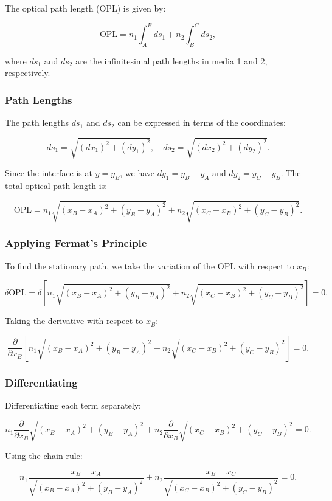 \documentclass[
  a4paper,
]{book}
\begin{document}
\begin{tcolorbox}
The optical path length (OPL) is given by:

\[
\text{OPL} = n_1 \int_{A}^{B} ds_1 + n_2 \int_{B}^{C} ds_2,
\]

where \(ds_1\) and \(ds_2\) are the infinitesimal path lengths in media
1 and 2, respectively.

\subsubsection{Path Lengths}\label{path-lengths}

The path lengths \(ds_1\) and \(ds_2\) can be expressed in terms of the
coordinates:

\[
ds_1 = \sqrt{(dx_1)^2 + (dy_1)^2}, \quad ds_2 = \sqrt{(dx_2)^2 + (dy_2)^2}.
\]

Since the interface is at \(y = y_B\), we have \(dy_1 = y_B - y_A\) and
\(dy_2 = y_C - y_B\). The total optical path length is:

\[
\text{OPL} = n_1 \sqrt{(x_B - x_A)^2 + (y_B - y_A)^2} + n_2 \sqrt{(x_C - x_B)^2 + (y_C - y_B)^2}.
\]

\subsubsection{Applying Fermat's
Principle}\label{applying-fermats-principle}

To find the stationary path, we take the variation of the OPL with
respect to \(x_B\):

\[
\delta \text{OPL} = \delta \left[ n_1 \sqrt{(x_B - x_A)^2 + (y_B - y_A)^2} + n_2 \sqrt{(x_C - x_B)^2 + (y_C - y_B)^2} \right] = 0.
\]

Taking the derivative with respect to \(x_B\):

\[
\frac{\partial}{\partial x_B} \left[ n_1 \sqrt{(x_B - x_A)^2 + (y_B - y_A)^2} + n_2 \sqrt{(x_C - x_B)^2 + (y_C - y_B)^2} \right] = 0.
\]

\subsubsection{Differentiating}\label{differentiating}

Differentiating each term separately:

\[
n_1 \frac{\partial}{\partial x_B} \sqrt{(x_B - x_A)^2 + (y_B - y_A)^2} + n_2 \frac{\partial}{\partial x_B} \sqrt{(x_C - x_B)^2 + (y_C - y_B)^2} = 0.
\]

Using the chain rule:

\[
n_1 \frac{x_B - x_A}{\sqrt{(x_B - x_A)^2 + (y_B - y_A)^2}} + n_2 \frac{x_B - x_C}{\sqrt{(x_C - x_B)^2 + (y_C - y_B)^2}} = 0.
\]


\end{tcolorbox}
\end{document}
